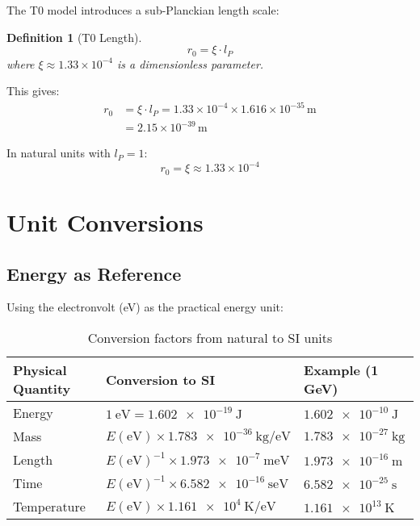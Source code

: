 \documentclass[11pt,a4paper]{article}
\newtheorem{definition}{Definition}[section]
\begin{document}
	The T0 model introduces a sub-Planckian length scale:
	
	\begin{definition}[T0 Length]
		\begin{equation}
			r_0 = \xi \cdot l_P
		\end{equation}
		where $\xi \approx 1.33 \times 10^{-4}$ is a dimensionless parameter.
	\end{definition}
	
	This gives:
	\begin{align}
		r_0 &= \xi \cdot l_P = 1.33 \times 10^{-4} \times 1.616 \times 10^{-35}\,\text{m} \\
		&= 2.15 \times 10^{-39}\,\text{m}
	\end{align}
	
	In natural units with $l_P = 1$:
	\begin{equation}
		r_0 = \xi \approx 1.33 \times 10^{-4}
	\end{equation}
	
	\section{Unit Conversions}
	
	\subsection{Energy as Reference}
	
	Using the electronvolt (eV) as the practical energy unit:
	
	\begin{table}[htbp]
		\centering
		\begin{adjustbox}{width=0.9\textwidth}
			\begin{tabular}{lll}
				\toprule
				\textbf{Physical Quantity} & \textbf{Conversion to SI} & \textbf{Example (1 GeV)} \\
				\midrule
				Energy & $\SI{1}{\electronvolt} = \SI{1.602e-19}{\joule}$ & $\SI{1.602e-10}{\joule}$ \\
				Mass & $E(\text{eV}) \times \SI{1.783e-36}{\kilogram\per\electronvolt}$ & $\SI{1.783e-27}{\kilogram}$ \\
				Length & $E(\text{eV})^{-1} \times \SI{1.973e-7}{\meter\electronvolt}$ & $\SI{1.973e-16}{\meter}$ \\
				Time & $E(\text{eV})^{-1} \times \SI{6.582e-16}{\second\electronvolt}$ & $\SI{6.582e-25}{\second}$ \\
				Temperature & $E(\text{eV}) \times \SI{1.161e4}{\kelvin\per\electronvolt}$ & $\SI{1.161e13}{\kelvin}$ \\
				\bottomrule
			\end{tabular}
		\end{adjustbox}
		\caption{Conversion factors from natural to SI units}
		\label{tab:conversions}
	\end{table}
	
\end{document}
